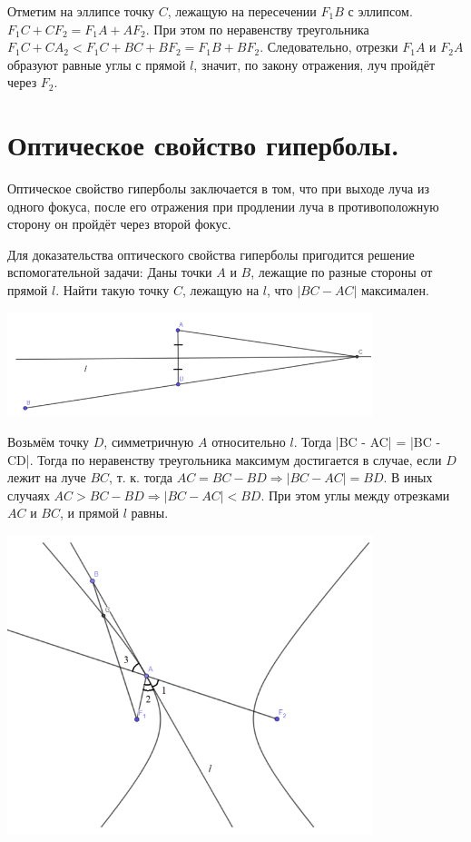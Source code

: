 \documentclass[12pt]{article}
\begin{document}
\begin{sloppypar}
    Отметим на эллипсе точку $C$, лежащую на пересечении $F_1B$ с эллипсом. $F_1C + CF_2 = F_1A + AF_2$. При этом по неравенству треугольника $F_1C + CA_2 < F_1C + BC + BF_2 = F_1B + BF_2$. Следовательно, отрезки $F_1A$ и $F_2A$ образуют равные углы с прямой $l$, значит, по закону отражения, луч пройдёт через $F_2$.

    \section{Оптическое свойство гиперболы.}
    Оптическое свойство гиперболы заключается в том, что при выходе луча из одного фокуса, после его отражения при продлении луча в противоположную сторону он пройдёт через второй фокус.

    Для доказательства оптического свойства гиперболы пригодится решение вспомогательной задачи: Даны точки $A$ и $B$, лежащие по разные стороны от прямой $l$. Найти такую точку $C$, лежащую на $l$, что $|BC - AC|$ максимален.

    \includegraphics[width=0.8\textwidth]{graphics/Вспомогательная_гипербола.png}

    Возьмём точку $D$, симметричную $A$ относительно $l$. Тогда |BC - AC| = |BC - CD|. Тогда по неравенству треугольника максимум достигается в случае, если $D$ лежит на луче $BC$, т. к. тогда $AC = BC - BD \Rightarrow |BC - AC| = BD$. В иных случаях $AC > BC - BD \Rightarrow |BC - AC| < BD$.
    При этом углы между отрезками $AC$ и $BC$, и прямой $l$ равны.

    \includegraphics[width=0.8\textwidth]{graphics/Гипербола.png}


\end{sloppypar}
\end{document}
